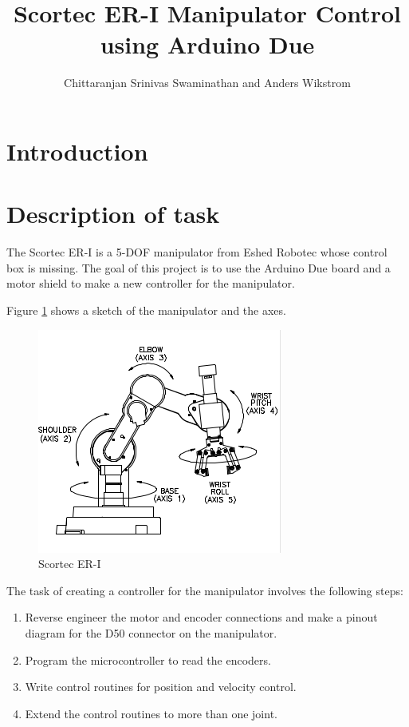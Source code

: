 \documentclass[10pt,a4paper]{article}
\author{Chittaranjan Srinivas Swaminathan and Anders Wikstrom}
\title{Scortec ER-I Manipulator Control using Arduino Due}
\begin{document}
\maketitle
\tableofcontents
\newpage
\section{Introduction}

\section{Description of task}
The Scortec ER-I is a 5-DOF manipulator from Eshed Robotec whose
control box is missing. The goal of this project is to use the Arduino
Due board and a motor shield to make a new controller for the
manipulator. 

Figure \ref{fig:axes} shows a sketch of the manipulator and the axes.

\begin{figure}[h]
    \centering
    \includegraphics{axes.png}
    \caption{Scortec ER-I}
    \label{fig:axes}
\end{figure}

The task of creating a controller for the manipulator involves the
following steps:
\begin{enumerate}
\item Reverse engineer the motor and encoder connections and make a
  pinout diagram for the D50 connector on the manipulator.
\item Program the microcontroller to read the encoders.
\item Write control routines for position and velocity control.
\item Extend the control routines to more than one joint.
\end{enumerate}
\end{document}
